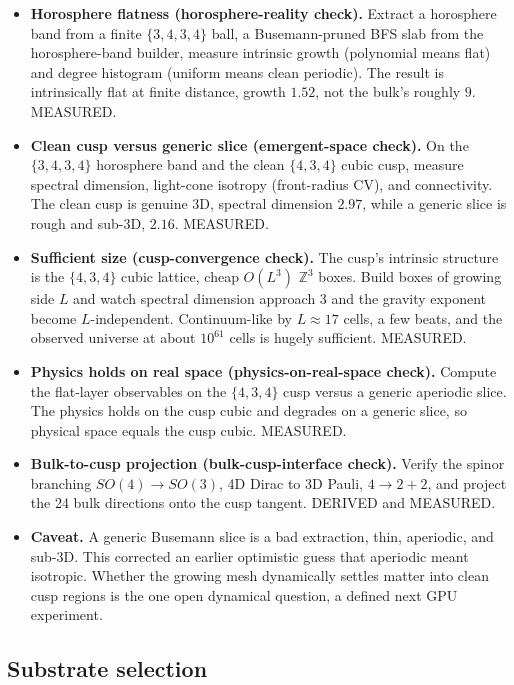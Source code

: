 \begin{itemize}
  \item \textbf{Horosphere flatness (horosphere-reality check).} Extract a horosphere band from a finite
  $\{3,4,3,4\}$ ball, a Busemann-pruned BFS slab from the horosphere-band builder, measure intrinsic growth
  (polynomial means flat) and degree histogram (uniform means clean periodic). The result is intrinsically flat at
  finite distance, growth $1.52$, not the bulk's roughly $9$. MEASURED.
  \item \textbf{Clean cusp versus generic slice (emergent-space check).} On the $\{3,4,3,4\}$ horosphere
  band and the clean $\{4,3,4\}$ cubic cusp, measure spectral dimension, light-cone isotropy (front-radius CV),
  and connectivity. The clean cusp is genuine 3D, spectral dimension $2.97$, while a generic slice is rough and
  sub-3D, $2.16$. MEASURED.
  \item \textbf{Sufficient size (cusp-convergence check).} The cusp's intrinsic structure is the $\{4,3,4\}$
  cubic lattice, cheap $O(L^3)$ $\mathbb{Z}^3$ boxes. Build boxes of growing side $L$ and watch spectral dimension
  approach 3 and the gravity exponent become $L$-independent. Continuum-like by $L \approx 17$ cells, a few beats,
  and the observed universe at about $10^{61}$ cells is hugely sufficient. MEASURED.
  \item \textbf{Physics holds on real space (physics-on-real-space check).} Compute the flat-layer observables
  on the $\{4,3,4\}$ cusp versus a generic aperiodic slice. The physics holds on the cusp cubic and degrades on a
  generic slice, so physical space equals the cusp cubic. MEASURED.
  \item \textbf{Bulk-to-cusp projection (bulk-cusp-interface check).} Verify the spinor branching
  $SO(4) \to SO(3)$, 4D Dirac to 3D Pauli, $4 \to 2 + 2$, and project the 24 bulk directions onto the cusp
  tangent. DERIVED and MEASURED.
  \item \textbf{Caveat.} A generic Busemann slice is a bad extraction, thin, aperiodic, and sub-3D. This corrected
  an earlier optimistic guess that aperiodic meant isotropic. Whether the growing mesh dynamically settles matter
  into clean cusp regions is the one open dynamical question, a defined next GPU experiment.
\end{itemize}

\subsection{Substrate selection}

